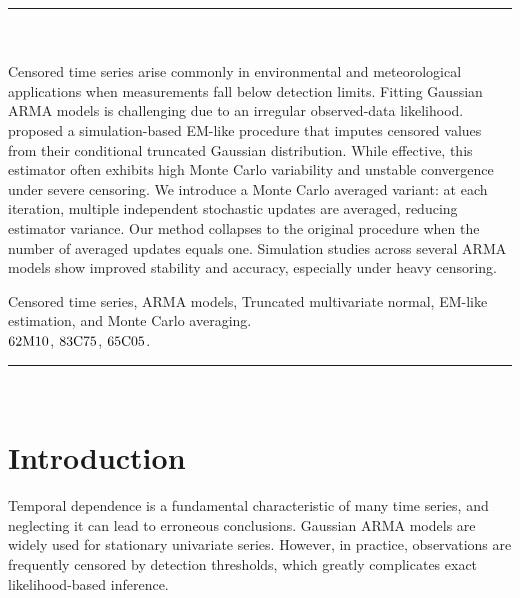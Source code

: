 \documentclass[10pt,twoside]{article}
\numberwithin{equation}{section}
\begin{document}
\rule{\textwidth}{0.2mm}\\


\\

Censored time series arise commonly in environmental and meteorological applications when measurements fall below detection limits. Fitting Gaussian ARMA models is challenging due to an irregular observed-data likelihood. \cite{park2007} proposed a simulation-based EM-like procedure that imputes censored values from their conditional truncated Gaussian distribution. While effective, this estimator often exhibits high Monte Carlo variability and unstable convergence under severe censoring. We introduce a Monte Carlo averaged variant: at each iteration, multiple independent stochastic updates are averaged, reducing estimator variance. Our method collapses to the original procedure when the number of averaged updates equals one. Simulation studies across several ARMA models show improved stability and accuracy, especially under heavy censoring. 

 


Censored time series, ARMA models, Truncated multivariate normal, EM-like estimation, and Monte Carlo averaging. \\

 $\rm 62M10$, $\rm 83C75$, $\rm 65C05$. \\

\hspace{1cm}\rule{\textwidth}{0.2mm}\\


\section{Introduction}

\label{sec:intro}

Temporal dependence is a fundamental characteristic of many time series, and neglecting it can lead to erroneous conclusions. Gaussian ARMA models are widely used for stationary univariate series. However, in practice, observations are frequently censored by detection thresholds, which greatly complicates exact likelihood-based inference.
\end{document}
